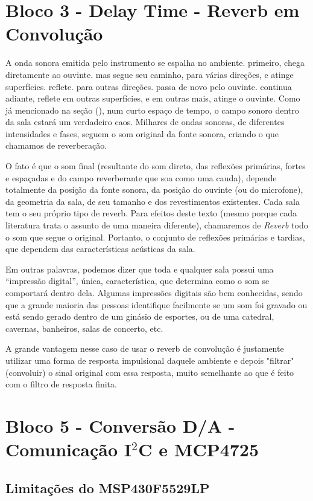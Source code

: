 		
\section{Bloco 3 - Delay Time - Reverb em Convolução}
		
		A onda sonora emitida pelo instrumento se espalha no ambiente. primeiro, chega diretamente ao ouvinte. mas segue seu caminho, para várias direções, e atinge superfícies. reflete. para outras direções. passa de novo pelo ouvinte. continua adiante, reflete em outras superfícies, e em outras mais, atinge o ouvinte. Como já mencionado na seção (), num curto espaço de tempo, o campo sonoro dentro da sala estará um verdadeiro caos. Milhares de ondas sonoras, de diferentes intensidades e fases, seguem o som original da fonte sonora, criando o que chamamos de reverberação.
		
		O fato é que o som final (resultante do som direto, das reflexões primárias, fortes e espaçadas e do campo reverberante que soa como uma cauda), depende totalmente da posição da fonte sonora, da posição do ouvinte (ou do microfone), da geometria da sala, de seu tamanho e dos revestimentos existentes. Cada sala tem o seu próprio tipo de reverb. Para efeitos deste texto (mesmo porque cada literatura trata o assunto de uma maneira diferente), chamaremos de \textit{Reverb} todo o som que segue o original. Portanto, o conjunto de reflexões primárias e tardias, que dependem das características acústicas da sala.
		
		Em outras palavras, podemos dizer que toda e qualquer sala possui uma “impressão digital”, única, característica, que determina como o som se comportará dentro dela. Algumas impressões digitais são bem conhecidas, sendo que a grande maioria das pessoas identifique facilmente se um som foi gravado ou está sendo gerado dentro de um ginásio de esportes, ou de uma catedral, cavernas,  banheiros, salas de concerto, etc.
		
		A grande vantagem nesse caso de usar o reverb de convolução é justamente utilizar uma forma de resposta impulsional daquele ambiente e depois "filtrar" (convoluir) o sinal original com essa resposta, muito semelhante ao que é feito com o filtro de resposta finita.

\section{Bloco 5 - Conversão D/A - Comunicação I$^2$C e MCP4725}
	
	
	\subsection{Limitações do MSP430F5529LP}
		
